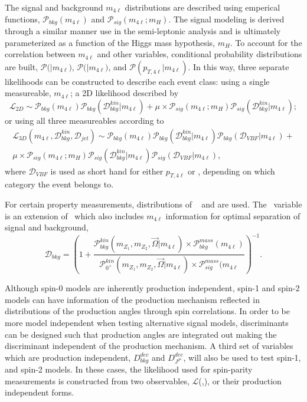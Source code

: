 The signal and background 
$m_{4\ell}$ distributions are described using emperical functions, 
$\mathscr{P}_{bkg}(m_{4\ell})$ and $\mathscr{P}_{sig}(m_{4\ell};m_{H})$.  
The signal modeling is derived 
through a similar manner use in the semi-leptonic analysis and
is ultimately parameterized as a function of the Higgs mass 
hypothesis, $m_H$.
To account for the correlation between $m_{4\ell}$ and other
variables, conditional probability distributions are built, 
$\mathscr{P}($\KD$|m_{4\ell})$, $\mathscr{P}($\Djet$|m_{4\ell})$,
and $\mathscr{P}(p_{T,4\ell}|m_{4\ell})$.  
In this way,
three separate likelihoods can be constructed to describe 
each event class: using a single measureable, $m_{4\ell}$;
a 2D likelihood described by
\begin{equation}
\mathscr{L}_{2D}\sim\mathscr{P}_{bkg}(m_{4\ell})\mathscr{P}_{bkg}(\mathscr{D}_{bkg}^{kin}|m_{4\ell})+\mu\times\mathscr{P}_{sig}(m_{4\ell};m_H)\mathscr{P}_{sig}(\mathscr{D}_{bkg}^{kin}|m_{4\ell});
\end{equation}
or using all three measureables according to
\begin{equation}
\begin{split}
\mathscr{L}_{3D}(m_{4\ell},\mathscr{D}^{kin}_{bkg},\mathscr{D}_{jet})\sim\mathscr{P}_{bkg}(m_{4\ell})\mathscr{P}_{bkg}(\mathscr{D}^{kin}_{bkg}|m_{4\ell})\mathscr{P}_{bkg}(\mathscr{D}_{VBF}|m_{4\ell})+ \\
\mu\times\mathscr{P}_{sig}(m_{4\ell};m_H)\mathscr{P}_{sig}(\mathscr{D}^{kin}_{bkg}|m_{4\ell})\mathscr{P}_{sig}(\mathscr{D}_{VBF}|m_{4\ell}),
\end{split}
\end{equation}
where $\mathscr{D}_{VBF}$ is used as short hand for either $p_{T,4\ell}$ or \Djet, 
depending on which category the event belongs to. 

For certain property measurements, distributions of \spinKD~
and \superKD are used.  The \superKD~variable is an extension
of \KD~which also includes $m_{4\ell}$ information for optimal 
separation of signal and background,
\begin{equation}
\mathscr{D}_{bkg}=\left(1+\frac{\mathscr{P}^{kin}_{bkg}(m_{Z_1},m_{Z_2},\vec{\Omega}|m_{4\ell})\times\mathscr{P}^{mass}_{bkg}(m_{4\ell})}{\mathscr{P}^{kin}_{0^+}(m_{Z_1},m_{Z_2},\vec{\Omega}|m_{4\ell})\times\mathscr{P}^{mass}_{sig}(m_{4\ell}}\right)^{-1}.
\end{equation}

Although spin-0 models are
inherently production independent, spin-1 and spin-2 models
can have information of the production mechanism reflected in 
distributions of the production angles through spin correlations.
In order to be more model independent when testing alternative
signal models, discriminants can be designed such that production
angles are integrated out making the discriminant independent 
of the production mechanism.  A third set of variables which 
are production independent, $D_{bkg}^{dec}$ and $D_{J^P}^{dec}$,
will also be used to test spin-1, and spin-2 models.
In these cases, the likelihood used for spin-parity measurements 
is constructed 
from two observables, $\mathscr{L}$(\superKD,\spinKD), or 
their production independent forms. 

